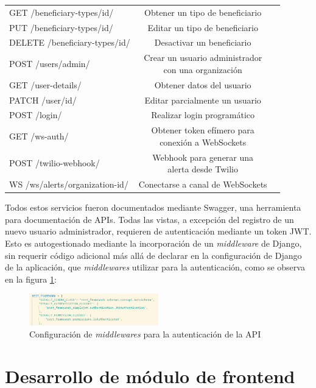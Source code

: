 \begin{table}[H]
\begin{tabular}{l c c}
		GET /beneficiary-types/{id}/ & Obtener un tipo de beneficiario \\
		PUT /beneficiary-types/{id}/ & Editar un tipo de beneficiario		\\
		DELETE /beneficiary-types/{id}/ & Desactivar un beneficiario \\
		\hline
		POST /users/admin/ & \makecell{Crear un usuario administrador \\ con una organización}  \\			
		GET /user-details/ & Obtener datos del usuario \\
		PATCH /user/{id}/ & Editar parcialmente un usuario \\
		\hline
		POST /login/ & Realizar login programático \\	
		GET /ws-auth/ & \makecell{Obtener token efímero para \\ conexión a WebSockets} \\
		POST /twilio-webhook/ & \makecell{Webhook para generar una \\ alerta desde Twilio} \\	
		WS /ws/alerts/organization-{id}/ & Conectarse a canal de WebSockets	\\
		\bottomrule
		\hline
	\end{tabular}
	\label{tab:endpoints}
\end{table}

Todos estos servicios fueron documentados mediante Swagger, una herramienta para documentación de APIs\citep{DJANGO:6}. Todas las vistas, a excepción del registro de un nuevo usuario administrador, requieren de autenticación mediante un token JWT. Esto es autogestionado mediante la incorporación de un \textit{middleware} de Django, sin requerir código adicional más allá de declarar en la configuración de Django de la aplicación, que \textit{middlewares} utilizar para la autenticación, como se observa en la figura \ref{backend:settings1}:

\begin{figure}[H]
	\centering
	\includegraphics[width=0.5\textwidth]{./Figures/backend-settings1.png}
	\caption{Configuración de \textit{middlewares} para la autenticación de la API}
	\label{backend:settings1}
\end{figure}

\section{Desarrollo de módulo de frontend}

